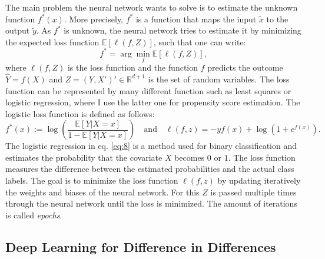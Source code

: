 The main problem the neural network wants to solve is to estimate the unknown function $f^*(x)$.
More precisely, $f^*$ is a function that maps the input $\tilde{x}$ to the output $\tilde{y}$.
As $f^*$ is unknown, the neural network tries to estimate it by minimizing the expected loss function $\mathbb{E}[\ell(f, Z)]$, such that one can write:
\begin{equation}
f^* = \arg \min_f \mathbb{E}[\ell(f, Z)],
\end{equation}
where $\ell(f, Z)$ is the loss function and the function $f$ predicts the outcome $\hat{Y} = f(X)$ and $Z = (Y, X')' \in \mathbb{R}^{d+1}$ is the set of random variables.
The loss function can be represented by many different function such as least squares or logistic regression, where I use the latter one for propensity score estimation.
The logistic loss function is defined as follows:
\begin{equation}
f^*(x) := \log \left( \frac{\mathbb{E}[Y|X = x]}{1 - \mathbb{E}[Y|X = x]} \right) \quad \text{and} \quad \ell(f, z) = -yf(x) + \log(1 + e^{f(x)}).
\label{eq:8}
\end{equation}
The logistic regression in eq. \ref*{eq:8} is a method used for binary classification and estimates the probability that the covariate $X$ becomes $0$ or $1$.
The loss function measures the difference between the estimated probabilities and the actual class labels.
The goal is to minimize the loss function $\ell(f, z)$ by updating iteratively the weights and biases of the neural network.
For this $Z$ is passed multiple times through the neural network until the loss is minimized.
The amount of iterations is called \textit{epochs}.

\subsection{Deep Learning for Difference in Differences}
